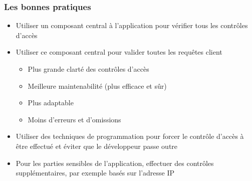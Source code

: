 \documentclass{beamer}
\begin{document}
\begin{frame}
  \frametitle{Les bonnes pratiques}
  \begin{exampleblock}{}
    \begin{itemize}
      \item Utiliser un composant central à l'application pour vérifier tous les contrôles d'accès
      \item Utiliser ce composant central pour valider toutes les requêtes client
      \begin{itemize}
        \item Plus grande clarté des contrôles d'accès
        \item Meilleure maintenabilité (plus efficace et sûr)
        \item Plus adaptable
        \item Moins d'erreurs et d'omissions
      \end{itemize}
    \end{itemize}
  \end{exampleblock}
  \begin{exampleblock}{}
    \begin{itemize}
      \item Utiliser des techniques de programmation pour forcer le contrôle d'accès à être effectué et éviter que le développeur passe outre
    \end{itemize}
  \end{exampleblock}
  \begin{exampleblock}{}
    \begin{itemize}
      \item Pour les parties sensibles de l'application, effectuer des contrôles supplémentaires, par exemple basés sur l'adresse IP
    \end{itemize}
  \end{exampleblock}
\end{frame}
\end{document}
